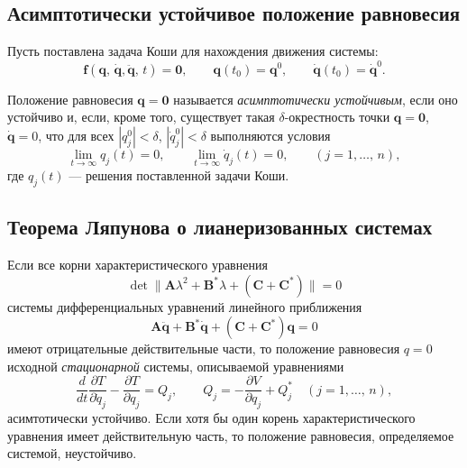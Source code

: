\documentclass[a4paper]{article}
\begin{document}
\subsection{Асимптотически устойчивое положение равновесия}
	Пусть 
	поставлена задача Коши для нахождения движения системы:
	\[
		\mathbf{f}\left( \mathbf{q},\,\dot{\mathbf{q}},
		\ddot{\mathbf{q}},\,t \right) =\mathbf{0}, \qquad
		\mathbf{q}(t_0)=\mathbf{q}^0,\qquad
		\dot{\mathbf{q}}(t_0)=\dot{\mathbf{q}}^0
	.\] 
\begin{dfn}
	Положение равновесия $\mathbf{q}=\mathbf{0}$ называется \emph{асимптотически
	устойчивым},
	если оно устойчиво и, если, кроме того, существует такая 
	$\delta$-окрестность точки $\mathbf{q}=\mathbf{0}$, $\dot{\mathbf{q}}=0$,
	что для всех $|q_j^0|<\delta$, $|\dot{q}_j^0|< \delta$ выполняются
	условия
	\[
		\lim_{t \to \infty} q_j (t)=0, \qquad \lim_{t \to \infty} 
		\dot{q}_j(t)=0,\qquad (j=1,\ldots,\,n)
	,\]
	где $q_j(t)$ --- решения поставленной задачи Коши.
\end{dfn}
\subsection{Теорема Ляпунова о лианеризованных системах}
\begin{thm}
	Если все корни характеристического уравнения
\[
	\det \|\mathbf{A}\lambda^2+\mathbf{B}^* \lambda +(\mathbf{C}+
	\mathbf{C}^*)\|=0
\]
системы дифференциальных уравнений линейного приближения
\[
	\mathbf{A}\ddot{\mathbf{q}}+\mathbf{B}^* \dot{\mathbf{q}}+
	(\mathbf{C}+\mathbf{C}^*)\mathbf{q}=0
\]
имеют отрицательные действительные части, то положение равновесия  $q=0$
исходной \emph{стационарной}
системы, описываемой уравнениями
\[
	\frac{d}{dt} \frac{\partial T}{\partial \dot{q}_j} -\frac{\partial T}{\partial q_j} =
	Q_j,\qquad Q_j=-\frac{\partial V}{\partial q_j} +Q_j^* \quad (j=1,\ldots,
	\,n)
,\] 
асимтотически устойчиво. Если хотя бы один корень характеристического уравнения
имеет действительную часть, то положение равновесия, определяемое системой,
неустойчиво.
\end{thm}
\end{document}
